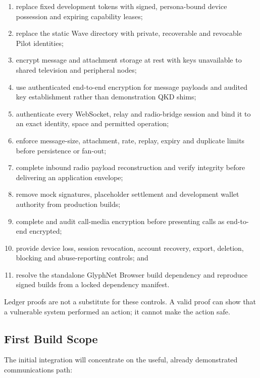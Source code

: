 \begin{enumerate}
  \item replace fixed development tokens with signed, persona-bound device
        possession and expiring capability leases;
  \item replace the static Wave directory with private, recoverable and
        revocable Pilot identities;
  \item encrypt message and attachment storage at rest with keys unavailable to
        shared television and peripheral nodes;
  \item use authenticated end-to-end encryption for message payloads and audited
        key establishment rather than demonstration QKD shims;
  \item authenticate every WebSocket, relay and radio-bridge session and bind it
        to an exact identity, space and permitted operation;
  \item enforce message-size, attachment, rate, replay, expiry and duplicate
        limits before persistence or fan-out;
  \item complete inbound radio payload reconstruction and verify integrity
        before delivering an application envelope;
  \item remove mock signatures, placeholder settlement and development wallet
        authority from production builds;
  \item complete and audit call-media encryption before presenting calls as
        end-to-end encrypted;
  \item provide device loss, session revocation, account recovery, export,
        deletion, blocking and abuse-reporting controls; and
  \item resolve the standalone GlyphNet Browser build dependency and reproduce
        signed builds from a locked dependency manifest.
\end{enumerate}

Ledger proofs are not a substitute for these controls. A valid proof can show
that a vulnerable system performed an action; it cannot make the action safe.

\subsection{First Build Scope}

The initial integration will concentrate on the useful, already demonstrated
communications path:

